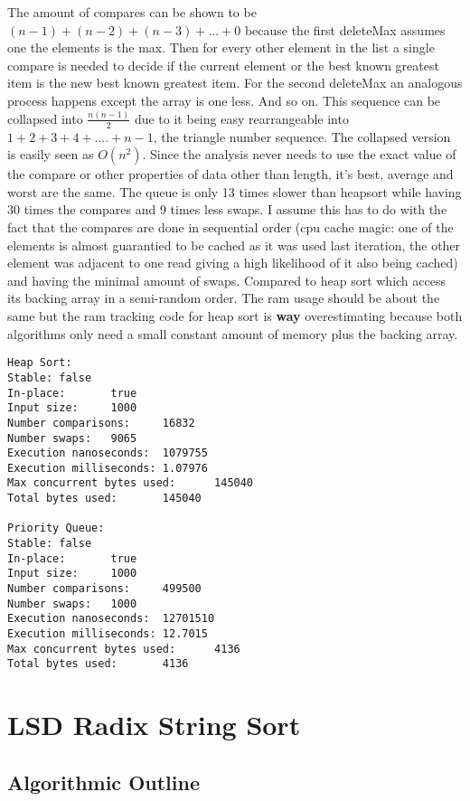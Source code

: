 \documentclass[12pt]{amsart}
\begin{document}
    The amount of compares can be shown to be $(n - 1) + (n - 2) + (n - 3) + ... + 0$ because the first deleteMax assumes one the elements is the max. Then for every other element in the list a single compare is needed to decide if the current element or the best known greatest item is the new best known greatest item.
    For the second deleteMax an analogous process happens except the array is one less. And so on.
    This sequence can be collapsed into $\frac{n(n - 1)}{2}$ due to it being easy rearrangeable into $1 + 2 + 3 + 4 + .... + n - 1$, the triangle number sequence.
    The collapsed version is easily seen as $O(n^2)$.
    Since the analysis never needs to use the exact value of the compare or other properties of data other than length, it's best, average and worst are the same.
    The queue is only 13 times slower than heapsort while having 30 times the compares and 9 times less swaps.
    I assume this has to do with the fact that the compares are done in sequential order (cpu cache magic: one of the elements is almost guarantied to be cached as it was used last iteration, the other element was adjacent to one read giving a high likelihood of it also being cached) and having the minimal amount of swaps.
    Compared to heap sort which access its backing array in a semi-random order.
    The ram usage should be about the same but the ram tracking code for heap sort is \textbf{way} overestimating because both algorithms only need a small constant amount of memory plus the backing array.
\begin{verbatim}
Heap Sort:
Stable: false
In-place:       true
Input size:     1000
Number comparisons:     16832
Number swaps:   9065
Execution nanoseconds:  1079755
Execution milliseconds: 1.07976
Max concurrent bytes used:      145040
Total bytes used:       145040

Priority Queue:
Stable: false
In-place:       true
Input size:     1000
Number comparisons:     499500
Number swaps:   1000
Execution nanoseconds:  12701510
Execution milliseconds: 12.7015
Max concurrent bytes used:      4136
Total bytes used:       4136
\end{verbatim}

\section{LSD Radix String Sort}

    \subsection{Algorithmic Outline}
\end{document}
